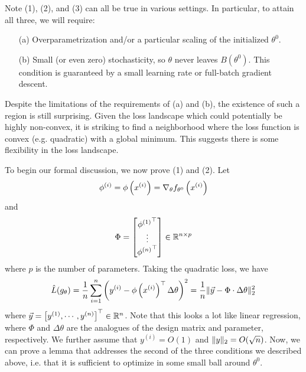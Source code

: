 Note (1), (2), and (3) can all be true in various settings. In particular, to attain all three, we will require: 
\begin{enumerate}[label=\alph*]
    \item[(a)] Overparametrization and/or a particular scaling of the initialized $\theta^0$. 
    \item[(b)] Small (or even zero) stochasticity, so $\theta$ never leaves $B(\theta^0)$. This condition is guaranteed by a small learning rate or full-batch gradient descent. 
\end{enumerate} 
Despite the limitations of the requirements of (a) and (b), the existence of such a region is still surprising. Given the loss landscape which could potentially be highly non-convex, it is striking to find a neighborhood where the loss function is convex (e.g. quadratic) with a global minimum. This suggests there is some flexibility in the loss landscape.  

To begin our formal discussion, we now prove (1) and (2). Let 
\begin{align}
    \phi^{(i)} = \phi\left(x^{(i)}\right) = \nabla_\theta f_{\theta^0}\left( x^{(i)} \right)
\end{align}
and 
\begin{align}
    \Phi = \begin{bmatrix} {\phi^{(1)}}^\top \\ \vdots \\ {\phi^{(n)}}^\top \end{bmatrix} \in \mathbb R^{n \times p}
\end{align}
where $p$ is the number of parameters. Taking the quadratic loss, we have
\begin{align}
    \hat{L}(g_\theta) = \frac{1}{n}\sum_{i=1}^n \left( y^{(i)} - \phi\left(x^{(i)} \right)^\top \Delta \theta \right)^2 = \frac{1}{n} \|\vec{y} - \Phi \cdot \Delta \theta\|_2^2
\end{align} 
where $\vec{y} = \left[ y^{(1)}, \cdots, y^{(n)} \right]^\top \in \mathbb R^n$. Note that this looks a lot like linear regression, where $\Phi$ and $\Delta \theta$ are the analogues of the design matrix and parameter, respectively. We further assume that $y^{(i)} = O(1)$ and $\|y\|_2 = O(\sqrt{n})$. Now, we can prove a lemma that addresses the second of the three conditions we described above, i.e. that it is sufficient to optimize in some small ball around $\theta^0$.

